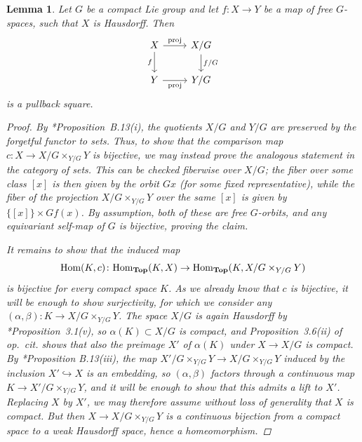 \documentclass[reqno]{memo-l}
\theoremstyle{mythm}
\newtheorem{lemma}[thm]{Lemma}
\theoremstyle{definition}
\numberwithin{equation}{section}
\renewcommand{\hom}{\textup{hom}}
\newcommand{\cat}[1]{\textbf{\textup{#1}}}
\renewcommand{\hom}{{\textup{Hom}}}
\begin{document}
\begin{lemma}\label{lemma:quotient-pb}
    Let $G$ be a compact Lie group and let $f\colon X\to Y$ be a map of free $G$-spaces, such that $X$ is Hausdorff. Then
    \[
        \begin{tikzcd}
            X\arrow[r,"\textup{proj}"]\arrow[d,"f"'] & X/G\arrow[d,"f/G"]\\
            Y\arrow[r,"\textup{proj}"'] & Y/G
        \end{tikzcd}
    \]
    is a pullback square.
    \begin{proof}
        By \cite{schwede2018global}*{Proposition~B.13(i)}, the quotients $X/G$ and $Y/G$ are preserved by the forgetful functor to sets. Thus, to show that the comparison map $c\colon X\to X/G\times_{Y/G}Y$ is bijective, we may instead prove the analogous statement in the category of sets. This can be checked fiberwise over $X/G$; the fiber over some class $[x]$ is then given by the orbit $Gx$ (for some fixed representative), while the fiber of the projection $X/G\times_{Y/G}Y$ over the same $[x]$ is given by $\{[x]\}\times Gf(x)$. By assumption, both of these are free $G$-orbits, and any equivariant self-map of $G$ is bijective, proving the claim.
    
        It remains to show that the induced map 
        \[
            \hom(K,c)\colon\hom_{\cat{Top}}(K,X)\to\hom_{\cat{Top}}(K,X/G\times_{Y/G}Y)
        \]
        is bijective for every compact space $K$. As we already know that $c$ is bijective, it will be enough to show surjectivity, for which we consider any $(\alpha,\beta)\colon K\to X/G\times_{Y/G}Y$. The space $X/G$ is again Hausdorff by \cite{tom-Dieck-trafo}*{Proposition~3.1(v)}, so $\alpha(K)\subset X/G$ is compact, and Proposition~3.6(ii) of \emph{op.\ cit.} shows that also the preimage $X'$ of $\alpha(K)$ under $X\to X/G$ is compact.         
        By \cite{schwede2018global}*{Proposition B.13(iii)}, the map $X'/G\times_{Y/G}Y\to X/G\times_{Y/G}Y$ induced by the inclusion $X'\hookrightarrow X$ is an embedding, so $(\alpha,\beta)$ factors through a continuous map $K\to X'/G\times_{Y/G}Y$, and it will be enough to show that this admits a lift to $X'$. Replacing $X$ by $X'$, we may therefore assume without loss of generality that $X$ is compact. But then $X\to X/G\times_{Y/G}Y$ is a continuous bijection from a compact space to a weak Hausdorff space, hence a homeomorphism.
    \end{proof}
\end{lemma}
\end{document}
